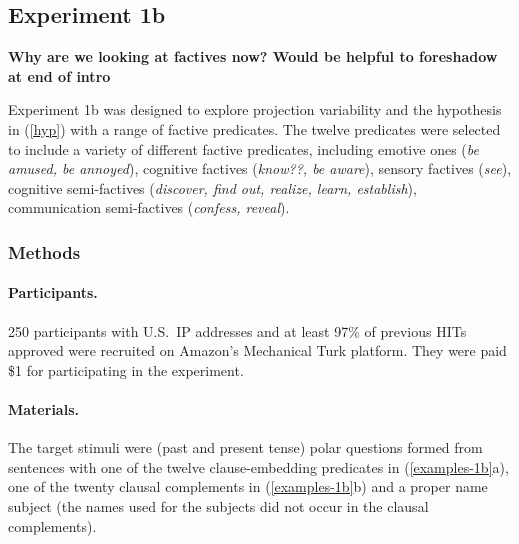 \documentclass[11pt,fleqn]{article}
\newcommand{\6}{\mbox{$[\hspace*{-.6mm}[$}}
\newcommand{\9}{\mbox{$]\hspace*{-.6mm}]$}}
\begin{document}
\subsection{Experiment 1b} 

{\bf Why are we looking at factives now? Would be helpful to foreshadow at end of intro}

Experiment 1b was designed to explore projection variability and the hypothesis in (\ref{hyp}) with a range of factive predicates. The twelve predicates were selected to include a variety of different factive predicates, including emotive ones ({\em be amused, be annoyed}), cognitive factives ({\em know??, be aware}), sensory factives ({\em see}), cognitive semi-factives ({\em discover, find out, realize, learn, establish}), communication semi-factives ({\em confess, reveal}).

\subsubsection{Methods}

\paragraph{Participants.} 250 participants with U.S.\ IP addresses and at least 97\% of previous HITs approved were recruited on Amazon's Mechanical Turk platform. They were paid 
\$1 for participating in the experiment. 

\paragraph{Materials.} The target stimuli were (past and present tense) polar questions formed from sentences with one of the twelve clause-embedding predicates in (\ref{examples-1b}a), one of the twenty clausal complements in (\ref{examples-1b}b) and a proper name subject (the names used for the subjects did not occur in the clausal complements). 
\end{document}
